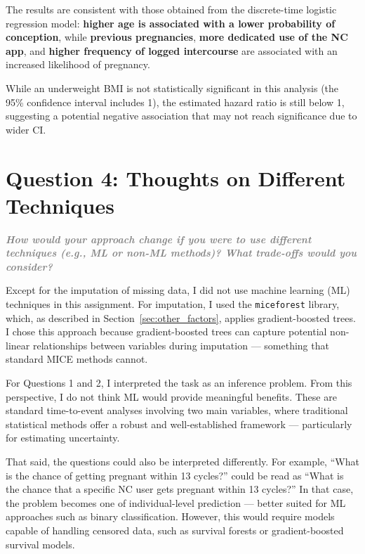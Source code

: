 \documentclass[11pt]{article}
\newcommand{\questiontext}[1]{\vspace{0.5em}\textbf{\textit{\textcolor{gray}{#1}}}}
\begin{document}
The results are consistent with those obtained from the discrete-time logistic regression model: \textbf{higher age is associated with a lower probability of conception}, while \textbf{previous pregnancies}, \textbf{more dedicated use of the NC app}, and \textbf{higher frequency of logged intercourse} are associated with an increased likelihood of pregnancy.

While an underweight BMI is not statistically significant in this analysis (the 95\% confidence interval includes 1), the estimated hazard ratio is still below 1, suggesting a potential negative association that may not reach significance due to wider CI.



\section{Question 4: Thoughts on Different Techniques}
\label{sec:thoughts}

\questiontext{How would your approach change if you were to use different techniques (e.g., ML or non-ML methods)? What trade-offs would you consider?}

Except for the imputation of missing data, I did not use machine learning (ML) techniques in this assignment. For imputation, I used the \texttt{miceforest} library, which, as described in Section~\ref{sec:other_factors}, applies gradient-boosted trees. I chose this approach because gradient-boosted trees can capture potential non-linear relationships between variables during imputation — something that standard MICE methods cannot.

For Questions 1 and 2, I interpreted the task as an inference problem. From this perspective, I do not think ML would provide meaningful benefits. These are standard time-to-event analyses involving two main variables, where traditional statistical methods offer a robust and well-established framework — particularly for estimating uncertainty.

That said, the questions could also be interpreted differently. For example, “What is the chance of getting pregnant within 13 cycles?” could be read as “What is the chance that a specific NC user gets pregnant within 13 cycles?” In that case, the problem becomes one of individual-level prediction — better suited for ML approaches such as binary classification. However, this would require models capable of handling censored data, such as survival forests or gradient-boosted survival models.
\end{document}
